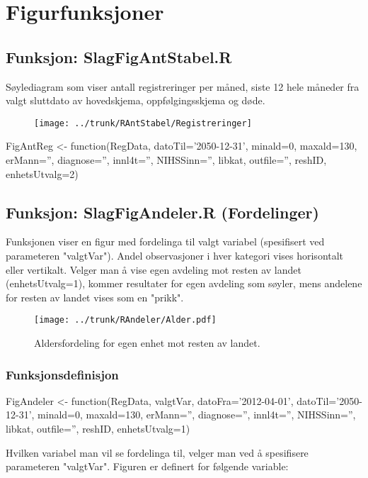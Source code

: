 \documentclass [norsk,a4paper,twoside]{article}
\begin{document}
\section{Figurfunksjoner}


\subsection{Funksjon: SlagFigAntStabel.R}
Søylediagram som viser antall registreringer per måned, siste 12 hele måneder fra valgt sluttdato av hovedskjema, oppfølgingsskjema og døde.

\begin{figure}
	\centering
	\texttt{[image: ../trunk/RAntStabel/Registreringer]}
	\caption{}
	\label{fig:Registreringer}
\end{figure}

FigAntReg  <- function(RegData, datoTil='2050-12-31', minald=0, maxald=130, erMann='', diagnose='', innl4t='', NIHSSinn='', libkat, outfile='', reshID, enhetsUtvalg=2)



\subsection{Funksjon: SlagFigAndeler.R (Fordelinger)}
Funksjonen viser en figur med fordelinga til valgt variabel (spesifisert ved parameteren "valgtVar"). Andel observasjoner i hver kategori vises horisontalt eller vertikalt. Velger man
å vise egen avdeling mot resten av landet (enhetsUtvalg=1), kommer resultater for egen avdeling som søyler, mens andelene for resten av landet vises som en "prikk".

\begin{figure}
\centering
\texttt{[image: ../trunk/RAndeler/Alder.pdf]}
\caption{Aldersfordeling for egen enhet mot resten av landet.}
\label{fig:Alder}
\end{figure}

\subsubsection{Funksjonsdefinisjon}
FigAndeler  <- function(RegData, valgtVar, datoFra='2012-04-01', datoTil='2050-12-31', 
minald=0, maxald=130, erMann='', diagnose='', innl4t='', NIHSSinn='', libkat, outfile='', 
reshID, enhetsUtvalg=1)

Hvilken variabel man vil se fordelinga til, velger man ved å spesifisere parameteren "valgtVar". Figuren er definert for følgende variable:\\
\end{document}
